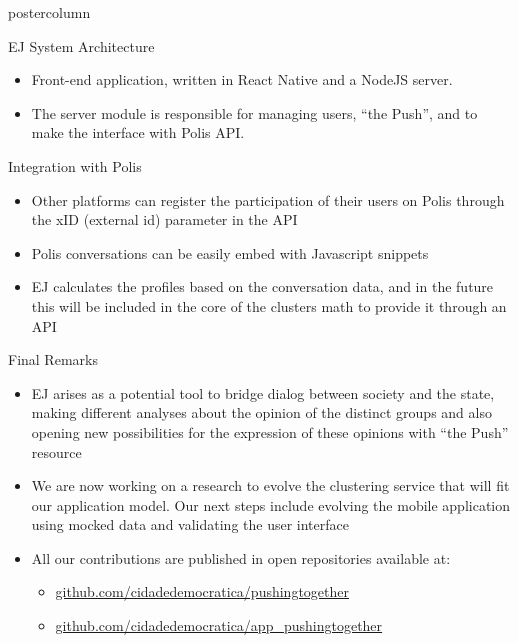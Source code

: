 \documentclass[final,hyperref={pdfpagelabels=false}]{beamer}
\begin{document}
\begin{frame}
\begin{columns}
\begin{column}{.49\textwidth}
\begin{beamercolorbox}[center,wd=\textwidth]{postercolumn}
\begin{minipage}[T]{.95\textwidth}
{\begin{block}{EJ System Architecture}
	\begin{itemize}
    \item Front-end application, written in React Native
    and a NodeJS server.

    \item The server module is responsible for managing users, ``the Push'', and
    to make the interface with Polis API.
  \end{itemize}

\end{block}

\begin{block}{Integration with Polis}
  \begin{itemize}
    \item Other platforms can register the participation of their users on Polis
    through the xID (external id) parameter in the API

    \item Polis conversations can be easily embed with Javascript snippets

    \item EJ calculates the profiles based on the conversation data, and in the future this
    will be included in the core of the clusters math to provide it through an API
  \end{itemize}
\end{block}
\begin{block}{Final Remarks}
  \begin{itemize}
    \item EJ arises as a potential tool to bridge dialog between society and
    the state, making different analyses about the opinion of the distinct groups
    and also opening new possibilities for the expression of these opinions with ``the
    Push'' resource

    \item We are now working on a research to evolve the clustering service that
    will fit our application model. Our next steps include evolving the
    mobile application using mocked data and validating the user interface

    \item All our contributions are published in open repositories available at:
      \begin{itemize}
        \color{blue}
        \item \url{github.com/cidadedemocratica/pushingtogether}
        \item \url{github.com/cidadedemocratica/app_pushingtogether}
      \end{itemize}
  \end{itemize}
\end{block}
      }
        \end{minipage}
      \end{beamercolorbox}
    \end{column}
  \end{columns}
\end{frame}
\end{document}
